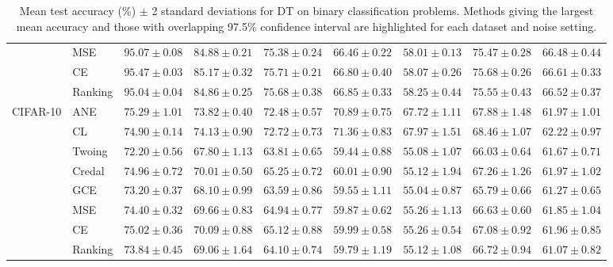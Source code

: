 \documentclass[letterpaper]{article} %
\begin{document}
\begin{table}[t]
\begin{tabular}{clccccccc}
 & MSE    & $95.07 \pm 0.08$ & $84.88 \pm 0.21$ & $75.38 \pm 0.24$ & $66.46 \pm 0.22$ & $58.01 \pm 0.13$ & $75.47 \pm 0.28$ & $66.48 \pm 0.44$ \\
 & CE     & $\mathbf{95.47 \pm 0.03}$ & $85.17 \pm 0.32$ & $75.71 \pm 0.21$ & $66.80 \pm 0.40$ & $58.07 \pm 0.26$ & $75.68 \pm 0.26$ & $66.61 \pm 0.33$ \\
 & Ranking & $95.04 \pm 0.04$ & $84.86 \pm 0.25$ & $75.68 \pm 0.38$ & $66.85 \pm 0.33$ & $58.25 \pm 0.44$ & $75.55 \pm 0.43$ & $66.52 \pm 0.37$ \\
\hline
\multirow{8}{*}{CIFAR-10}
 & ANE    & $\mathbf{75.29 \pm 1.01}$ & $\mathbf{73.82 \pm 0.40}$ & $\mathbf{72.48 \pm 0.57}$ & $\mathbf{70.89 \pm 0.75}$ & $\mathbf{67.72 \pm 1.11}$ & $\mathbf{67.88 \pm 1.48}$ & $\mathbf{61.97 \pm 1.01}$ \\
 & CL     & $\mathbf{74.90 \pm 0.14}$ & $\mathbf{74.13 \pm 0.90}$ & $\mathbf{72.72 \pm 0.73}$ & $\mathbf{71.36 \pm 0.83}$ & $\mathbf{67.97 \pm 1.51}$ & $\mathbf{68.46 \pm 1.07}$ & $\mathbf{62.22 \pm 0.97}$ \\
 & Twoing & $72.20 \pm 0.56$ & $67.80 \pm 1.13$ & $63.81 \pm 0.65$ & $59.44 \pm 0.88$ & $55.08 \pm 1.07$ & $66.03 \pm 0.64$ & $\mathbf{61.67 \pm 0.71}$ \\
 & Credal & $\mathbf{74.96 \pm 0.72}$ & $70.01 \pm 0.50$ & $65.25 \pm 0.72$ & $60.01 \pm 0.90$ & $55.12 \pm 1.94$ & $\mathbf{67.26 \pm 1.26}$ & $\mathbf{61.97 \pm 1.02}$ \\
 & GCE    & $73.20 \pm 0.37$ & $68.10 \pm 0.99$ & $63.59 \pm 0.86$ & $59.55 \pm 1.11$ & $55.04 \pm 0.87$ & $65.79 \pm 0.66$ & $\mathbf{61.27 \pm 0.65}$ \\
 & MSE    & $\mathbf{74.40 \pm 0.32}$ & $69.66 \pm 0.83$ & $64.94 \pm 0.77$ & $59.87 \pm 0.62$ & $55.26 \pm 1.13$ & $66.63 \pm 0.60$ & $\mathbf{61.85 \pm 1.04}$ \\
 & CE     & $\mathbf{75.02 \pm 0.36}$ & $70.09 \pm 0.88$ & $65.12 \pm 0.88$ & $59.99 \pm 0.58$ & $55.26 \pm 0.54$ & $\mathbf{67.08 \pm 0.92}$ & $\mathbf{61.96 \pm 0.85}$ \\
 & Ranking & $73.84 \pm 0.45$ & $69.06 \pm 1.64$ & $64.10 \pm 0.74$ & $59.79 \pm 1.19$ & $55.12 \pm 1.08$ & $66.72 \pm 0.94$ & $\mathbf{61.07 \pm 0.82}$ \\
\hline
\end{tabular}
\caption{Mean test accuracy (\%) $\pm$ 2 standard deviations for DT on binary classification problems. Methods giving the largest mean accuracy and those with overlapping 97.5\% confidence interval are highlighted for each dataset and noise setting.}
\label{tab:dt-bin}
\end{table}
\end{document}
